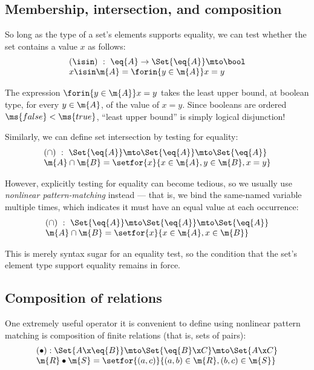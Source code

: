 
\subsection{Membership, intersection, and composition}

So long as the type of a set's elements supports equality, we can test whether
the set contains a value $x$ as follows:
\[\begin{array}{l}
(\isin) ~:~ \eq{A} \uto \Set{\eq{A}} \mto \bool\\
x \isin \m{A} = \forin{y \in \m{A}} x = y
\end{array}\]

The expression $\forin{y \in \m{A}} x = y$ takes the least upper bound, at
boolean type, for every $y \in \m{A}$, of the value of $x = y$. Since booleans
are ordered $\ms{false} < \ms{true}$, ``least upper bound'' is simply logical
disjunction! %

Similarly, we can define set intersection by testing for equality:
\[\begin{array}{l}
(\cap) ~:~ \Set{\eq{A}} \mto \Set{\eq{A}} \mto \Set{\eq{A}}\\
\m{A} \cap \m{B} = \setfor{x}{x \in \m{A}, y \in \m{B}, x = y}
\end{array}\]

However, explicitly testing for equality can become tedious, so we usually use
\emph{nonlinear pattern-matching} instead --- that is, we bind the same-named
variable multiple times, which indicates it must have an equal value at each
occurrence:
\[\begin{array}{l}
(\cap) ~:~ \Set{\eq{A}} \mto \Set{\eq{A}} \mto \Set{\eq{A}}\\
\m{A} \cap \m{B} = \setfor{x}{x \in \m{A}, x \in \m{B}}
\end{array}\]

This is merely syntax sugar for an equality test, so the condition that the
set's element type support equality remains in force. 



\subsection{Composition of relations}

One extremely useful operator it is convenient to define using nonlinear pattern
matching is composition of finite relations (that is, sets of pairs):
\[\begin{array}{l}
(\bullet) : \Set{A \x \eq{B}} \mto \Set{\eq{B} \x C} \mto \Set{A \x C}\\
\m{R} \bullet \m{S} = \setfor{(a,c)}{(a,b) \in \m{R}, (b,c) \in \m{S}}
\end{array}\]

